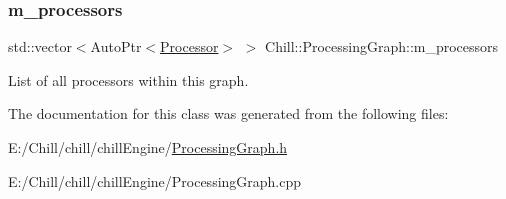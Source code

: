 \subsubsection{\texorpdfstring{m\+\_\+processors}{m\_processors}}
{\footnotesize\ttfamily std\+::vector$<$Auto\+Ptr$<$\mbox{\hyperlink{class_chill_1_1_processor}{Processor}}$>$ $>$ Chill\+::\+Processing\+Graph\+::m\+\_\+processors\hspace{0.3cm}{\ttfamily [protected]}}

List of all processors within this graph. 

The documentation for this class was generated from the following files\+:\begin{DoxyCompactItemize}
\item 
E\+:/\+Chill/chill/chill\+Engine/\mbox{\hyperlink{_processing_graph_8h}{Processing\+Graph.\+h}}\item 
E\+:/\+Chill/chill/chill\+Engine/Processing\+Graph.\+cpp\end{DoxyCompactItemize}
